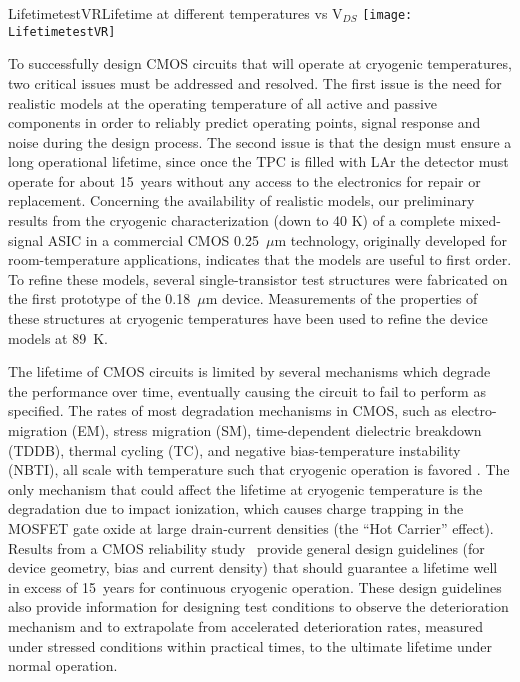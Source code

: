 \begin{cdrfigure}{LifetimetestVR}{Lifetime at different temperatures vs V$_{DS}$}
\texttt{[image: LifetimetestVR]}
\end{cdrfigure}

To successfully design CMOS circuits that will operate at cryogenic 
temperatures, two critical issues must be addressed and resolved. 
The first issue is the need for realistic models at the operating temperature 
of all active and passive components in order to reliably predict operating points,
signal response and noise during the design process.
The second issue is that the design must ensure a long operational lifetime, since once the TPC is filled 
with LAr the detector must operate for about 15~years without any access to the 
electronics for repair or replacement.
Concerning the availability of realistic models, 
our preliminary results from the cryogenic characterization (down to 40 K) of a complete 
mixed-signal ASIC \cite{CMOS-Compton} in a commercial CMOS 0.25~$\mu$m technology, 
originally developed for room-temperature applications, indicates that the models 
are useful to first order.
To refine these models, several 
single-transistor test structures were fabricated on the first prototype of the 0.18~$\mu$m device. 
Measurements of the properties of these structures at cryogenic temperatures 
have been used to refine the device models at 89~K. 

The lifetime of CMOS circuits is limited by several mechanisms which degrade 
the performance over time, eventually causing the circuit to fail to perform as specified. 
The rates of most degradation mechanisms in CMOS, such as electro-migration (EM), 
stress migration (SM), time-dependent dielectric breakdown (TDDB), thermal cycling (TC), 
and negative bias-temperature instability (NBTI), all scale with temperature such that 
cryogenic operation is favored \cite{CMOS-lifetime}\cite{PMOS-model}. The only mechanism 
that could affect the lifetime at cryogenic temperature is the degradation due to 
impact ionization, which causes charge trapping in the MOSFET gate oxide at 
large drain-current densities (the ``Hot Carrier'' effect). Results from a CMOS reliability study~\cite{CMOS-reliability} 
provide general design guidelines (for device geometry, bias and current density) 
that should guarantee a lifetime well in excess of 15~years for continuous cryogenic operation. 
These design guidelines also provide information for designing test conditions to observe the 
deterioration mechanism and to extrapolate from accelerated deterioration rates, 
measured under stressed conditions within practical times, to the ultimate lifetime under normal operation.

